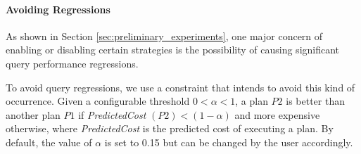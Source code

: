 \paragraph{Avoiding Regressions}

As shown in Section \ref{sec:preliminary_experiments}, one major concern of enabling or disabling certain strategies is the possibility of causing significant query performance regressions.

To avoid query regressions, we use a constraint that intends to avoid this kind of occurrence. Given a configurable threshold $0 < \alpha < 1$, a plan $P2$ is better than another plan $P1$ if \textit{PredictedCost} $(P2) < (1 - \alpha)$ and more expensive otherwise, where \textit{PredictedCost} is the predicted cost of executing a plan. By default, the value of $\alpha$ is set to 0.15 but can be changed by the user accordingly.